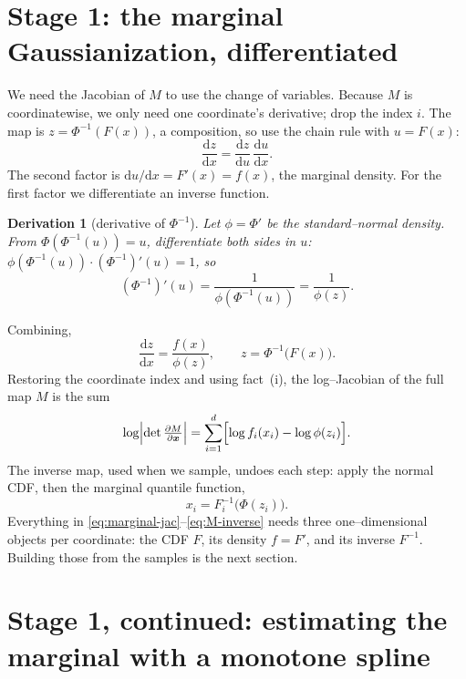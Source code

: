 \documentclass[11pt]{article}
\newcommand{\x}{\bm{x}}
\newtheorem*{deriv}{Derivation}
\theoremstyle{remark}
\begin{document}
\section{Stage 1: the marginal Gaussianization, differentiated}
\label{sec:gaussianization}

We need the Jacobian of $M$ to use the change of variables. Because $M$ is
coordinatewise, we only need one coordinate's derivative; drop the index $i$.
The map is $z=\Phi^{-1}(F(x))$, a composition, so use the chain rule with
$u=F(x)$:
\begin{equation}
\frac{\mathrm{d}z}{\mathrm{d}x}
=\frac{\mathrm{d}z}{\mathrm{d}u}\,\frac{\mathrm{d}u}{\mathrm{d}x}.
\end{equation}
The second factor is $\mathrm{d}u/\mathrm{d}x=F'(x)=f(x)$, the marginal density.
For the first factor we differentiate an inverse function.

\begin{deriv}[derivative of $\Phi^{-1}$]
Let $\phi=\Phi'$ be the standard--normal density. From $\Phi(\Phi^{-1}(u))=u$,
differentiate both sides in $u$: $\phi(\Phi^{-1}(u))\cdot(\Phi^{-1})'(u)=1$, so
\begin{equation}
(\Phi^{-1})'(u)=\frac{1}{\phi(\Phi^{-1}(u))}=\frac{1}{\phi(z)} .
\end{equation}
\end{deriv}

\noindent Combining,
\begin{equation}
\label{eq:marginal-jac}
\boxed{\;\frac{\mathrm{d}z}{\mathrm{d}x}=\frac{f(x)}{\phi(z)},
\qquad z=\Phi^{-1}\bigl(F(x)\bigr).\;}
\end{equation}
Restoring the coordinate index and using fact~(i), the log--Jacobian of the full
map $M$ is the sum
\begin{equation}
\label{eq:M-logdet}
\log\Bigl|\det \tfrac{\partial M}{\partial\x}\Bigr|
=\sum_{i=1}^{d}\Bigl[\log f_i(x_i)-\log\phi(z_i)\Bigr].
\end{equation}
The inverse map, used when we sample, undoes each step: apply the normal CDF, then
the marginal quantile function,
\begin{equation}
\label{eq:M-inverse}
x_i=F_i^{-1}\bigl(\Phi(z_i)\bigr).
\end{equation}
Everything in \eqref{eq:marginal-jac}--\eqref{eq:M-inverse} needs three
one--dimensional objects per coordinate: the CDF $F$, its density $f=F'$, and its
inverse $F^{-1}$. Building those from the samples is the next section.

\section{Stage 1, continued: estimating the marginal with a monotone spline}
\label{sec:pchip}
\end{document}
